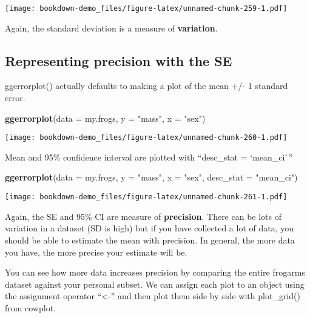 \documentclass[]{book}
\newenvironment{Shaded}{\begin{snugshade}}{\end{snugshade}}
\newcommand{\KeywordTok}[1]{\textcolor[rgb]{0.13,0.29,0.53}{\textbf{#1}}}
\newcommand{\DataTypeTok}[1]{\textcolor[rgb]{0.13,0.29,0.53}{#1}}
\newcommand{\StringTok}[1]{\textcolor[rgb]{0.31,0.60,0.02}{#1}}
\newcommand{\NormalTok}[1]{#1}
\theoremstyle{definition}
\theoremstyle{definition}
\theoremstyle{definition}
\theoremstyle{remark}
\begin{document}
\texttt{[image: bookdown-demo\_files/figure-latex/unnamed-chunk-259-1.pdf]}

Again, the standard deviation is a measure of \textbf{variation}.

\subsection{Representing precision with the
SE}\label{representing-precision-with-the-se}

ggerrorplot() actually defaults to making a plot of the mean +/- 1
standard error.

\begin{Shaded}
\begin{Highlighting}[]
\KeywordTok{ggerrorplot}\NormalTok{(}\DataTypeTok{data =}\NormalTok{ my.frogs,}
          \DataTypeTok{y =} \StringTok{"mass"}\NormalTok{,}
          \DataTypeTok{x =} \StringTok{"sex"}\NormalTok{)}
\end{Highlighting}
\end{Shaded}

\texttt{[image: bookdown-demo\_files/figure-latex/unnamed-chunk-260-1.pdf]}

Mean and 95\% confidence interval are plotted with ``desc\_stat =
`mean\_ci'\,''

\begin{Shaded}
\begin{Highlighting}[]
\KeywordTok{ggerrorplot}\NormalTok{(}\DataTypeTok{data =}\NormalTok{ my.frogs,}
          \DataTypeTok{y =} \StringTok{"mass"}\NormalTok{,}
          \DataTypeTok{x =} \StringTok{"sex"}\NormalTok{,}
          \DataTypeTok{desc_stat =} \StringTok{"mean_ci"}\NormalTok{)}
\end{Highlighting}
\end{Shaded}

\texttt{[image: bookdown-demo\_files/figure-latex/unnamed-chunk-261-1.pdf]}

Again, the SE and 95\% CI are measure of \textbf{precision}. There can
be lots of variation in a dataset (SD is high) but if you have collected
a lot of data, you should be able to estimate the mean with precision.
In general, the more data you have, the more precise your estimate will
be.

You can see how more data increases precision by comparing the entire
frogarms dataset against your personal subset. We can assign each plot
to an object using the assignment operator ``\textless{}-'' and then
plot them side by side with plot\_grid() from cowplot.
\end{document}

